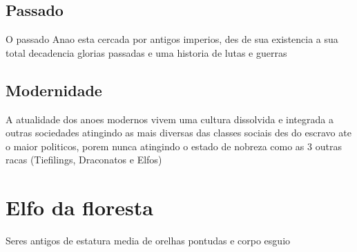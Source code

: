 \documentclass{book}
\begin{document}
\section{Passado}
O passado Anao esta cercada por antigos imperios, des de sua existencia a sua total decadencia
glorias passadas e uma historia de lutas e guerras 
\section{Modernidade}
A atualidade dos anoes modernos vivem uma cultura dissolvida e integrada a outras sociedades 
atingindo as mais diversas das classes sociais des do escravo ate o maior politicos, porem 
nunca atingindo o estado de nobreza como as 3 outras racas (Tiefilings, Draconatos e Elfos) 

\chapter{Elfo da floresta}
Seres antigos de estatura media de orelhas pontudas e corpo esguio
\end{document}
